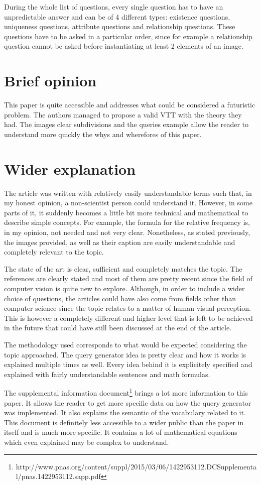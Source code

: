 \documentclass[10pt,a4paper]{scrartcl}
\begin{document}
During the whole list of questions, every single question has to have an unpredictable answer and can be of 4 different types: existence questions, uniqueness questions, attribute questions and relationship questions. These questions have to be asked in a particular order, since for example a relationship question cannot be asked before instantiating at least 2 elements of an image.
\section{Brief opinion}
This paper is quite accessible and addresses what could be considered a futuristic problem. The authors managed to propose a valid VTT with the theory they had. The images clear subdivisions and the queries example allow the reader to understand more quickly the whys and wherefores of this paper.
\section{Wider explanation}
The article was written with relatively easily understandable terms such that, in my honest opinion, a non-scientist person could understand it.
However, in some parts of it, it suddenly becomes a little bit more technical and mathematical to describe simple concepts. For example, the formula for the relative frequency is, in my opinion, not needed and not very clear.
Nonetheless, as stated previously, the images provided, as well as their caption are easily understandable and completely relevant to the topic. 

The state of the art is clear, sufficient and completely matches the topic. The references are clearly stated and most of them are pretty recent since the field of computer vision is quite new to explore. Although, in order to include a wider choice of questions, the articles could have also come from fields other than computer science since the topic relates to a matter of human visual perception. This is however a completely different and higher level that is left to be achieved in the future that could have still been discussed at the end of the article.

The methodology used corresponds to what would be expected considering the topic approached. The query generator idea is pretty clear and how it works is explained multiple times as well. Every idea behind it is explicitely specified and explained with fairly understandable sentences and math formulas.

The supplemental information document\footnote{http://www.pnas.org/content/suppl/2015/03/06/1422953112.DCSupplemental/pnas.1422953112.sapp.pdf} brings a lot more information to this paper. It allows the reader to get more specific data on how the query generator was implemented. It also explains the semantic of the vocabulary related to it. This document is definitely less accessible to a wider public than the paper in itself and is much more specific. It contains a lot of mathematical equations which even explained may be complex to understand.
\end{document}
